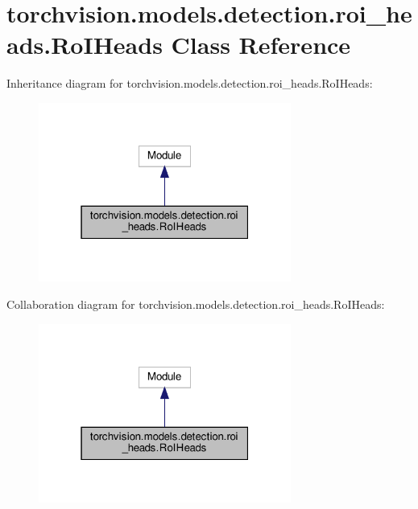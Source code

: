 \hypertarget{classtorchvision_1_1models_1_1detection_1_1roi__heads_1_1RoIHeads}{}\section{torchvision.\+models.\+detection.\+roi\+\_\+heads.\+Ro\+I\+Heads Class Reference}
\label{classtorchvision_1_1models_1_1detection_1_1roi__heads_1_1RoIHeads}


Inheritance diagram for torchvision.\+models.\+detection.\+roi\+\_\+heads.\+Ro\+I\+Heads\+:
\nopagebreak
\begin{figure}[H]
\begin{center}
\leavevmode
\includegraphics[width=235pt]{classtorchvision_1_1models_1_1detection_1_1roi__heads_1_1RoIHeads__inherit__graph}
\end{center}
\end{figure}


Collaboration diagram for torchvision.\+models.\+detection.\+roi\+\_\+heads.\+Ro\+I\+Heads\+:
\nopagebreak
\begin{figure}[H]
\begin{center}
\leavevmode
\includegraphics[width=235pt]{classtorchvision_1_1models_1_1detection_1_1roi__heads_1_1RoIHeads__coll__graph}
\end{center}
\end{figure}
